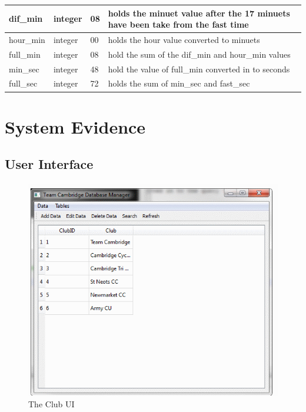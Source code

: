 \begin{longtable}{|l|l|l|p{4cm}|}
	dif\_min       & integer   & 08                    & holds the minuet value after the 17 minuets have been take from the fast time                              \\ \hline
	hour\_min      & integer   & 00                    & holds the hour value converted to minuets                                                                  \\ \hline
	full\_min      & integer   & 08                    & hold the sum of the dif\_min and hour\_min values                                                          \\ \hline
	min\_sec       & integer   & 48                    & hold the value of full\_min converted in to seconds                                                        \\ \hline
	full\_sec      & integer   & 72                    & holds the sum of min\_sec and fast\_sec                                                                    \\ \hline
\end{longtable}

\section{System Evidence}

\subsection{User Interface}

\clearpage

\begin{figure}
\includegraphics[width=\textwidth]{./Maintenance/UI/Club.png}
\caption{The Club UI} \label{fig:club_UI}
\end{figure}

